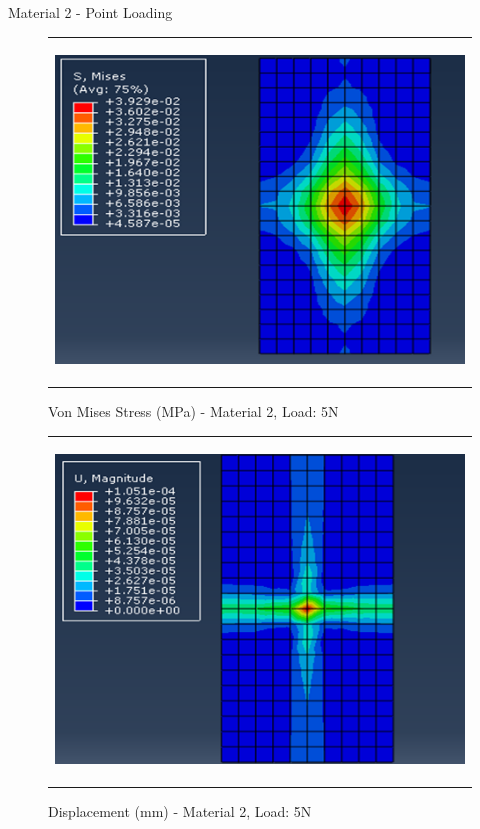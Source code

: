 \documentclass[a4paper,12pt]{article}
\numberwithin{equation}{section}
\numberwithin{figure}{section}
\begin{document}
\noindent Material 2 - Point Loading 
\begin{figure}[H]
  \centering
  \begin{tabular}{@{}c@{}}
    \includegraphics[width=0.7\linewidth,height=255pt]{Results/Point Loading/M2_VMS_L1.png} \\
  \end{tabular}
  \caption{Von Mises Stress (MPa) - Material 2, Load: 5N}
\end{figure}

\begin{figure}[H]
  \centering
  \begin{tabular}{@{}c@{}}
    \includegraphics[width=0.7\linewidth,height=255pt]{Results/Point Loading/M2_DIS_L1.png} \\
  \end{tabular}
  \caption{Displacement (mm) - Material 2, Load: 5N}
\end{figure}
\end{document}
